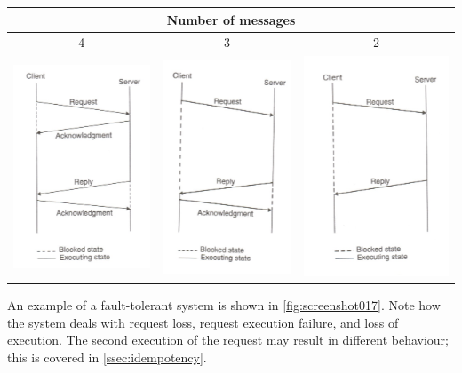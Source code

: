 \begin{tabular}{|c|c|c|}
\hline 
\multicolumn{3}{|c|}{Number of messages}  \\ 
\hline 
4 & 3 & 2 \\ 
\hline 
\includegraphics[width=0.3\linewidth, trim=0 0 0 -5]{screenshot014}
 & 
\includegraphics[width=0.3\linewidth, trim=0 0 0 -5]{screenshot015}
 & 
\includegraphics[width=0.3\linewidth, trim=0 0 0 -5]{screenshot016}
  \\ 
\hline 
\end{tabular} 

An example of a fault-tolerant system is shown in \autoref{fig:screenshot017}. Note how the system deals with request loss, request execution failure, and loss of execution. The second execution of the request may result in different behaviour; this is covered in \autoref{ssec:idempotency}.

